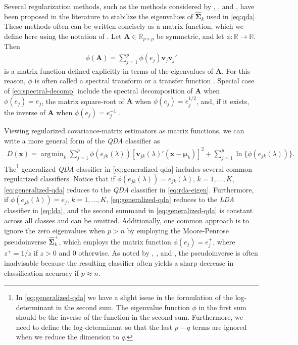 \documentclass[11pt]{article}
\DeclareMathOperator*{\argmin}{arg\,min}
\begin{document}
Several regularization methods, such as the methods considered by \citet*{Guo:2007te}, \cite{Mkhadri:1995jp}, and \citet*{Xu:2009fl}, have been proposed in the literature to stabilize the eigenvalues of $\widehat{\bm \Sigma}_k$ used in \eqref{eq:qda}. These methods often can be written concisely as a matrix function, which we define here using the notation of \cite{Izenman:2008gm}. Let $\bm A \in \mathbb{R}_{p \times p}$ be symmetric, and let $\phi:\mathbb{R} \rightarrow \mathbb{R}$. Then
\begin{align}
	\phi(\bm A) = \sum_{j = 1}^p \phi(e_j) \bm v_j \bm v_j'\label{eq:spectral-decomp}
\end{align}
is a matrix function defined explicitly in terms of the eigenvalues of $\bm A$. For this reason, $\phi$ is often called a spectral transform \citep{Ch15SSLBook} or a transfer function \citep{Ye:2009gd, Chapelle2002SSLChapter15Reference} . Special case of \eqref{eq:spectral-decomp} include the spectral decomposition of $\bm A$ when $\phi(e_j) = e_j$, the matrix square-root of $\bm A$ when $\phi(e_j) = e_j^{1/2}$, and, if it exists, the inverse of $\bm A$ when $\phi(e_j) = e_j^{-1}$ \citep{Harville:2008wja}.

Viewing regularized covariance-matrix estimators as matrix functions, we can write a more general form of the \emph{QDA} classifier as
\begin{align}
  D(\bm x) = \argmin_{k} \sum_{j = 1}^p \phi(e_{jk}(\lambda))[\bm v_{jk}(\lambda)' (\bm x - \bm \mu_k)]^2 + \sum_{j=1}^p \ln \{ \phi(e_{jk}(\lambda)) \}. \label{eq:generalized-qda}
\end{align}
The\footnote{In \eqref{eq:generalized-qda} we have a slight issue in the formulation of the log-determinant in the second sum. The eigenvalue function $\phi$ in the first sum should be the inverse of the function in the second sum. Furthermore, we need to define the log-determinant so that the last $p - q$ terms are ignored when we reduce the dimension to $q$.} generalized \emph{QDA} classifier in \eqref{eq:generalized-qda} includes several common regularized classifiers. Notice that if  $\phi(e_{jk}(\lambda)) = e_{jk}(\lambda)$, $k = 1, \ldots, K$, \eqref{eq:generalized-qda} reduces to the \emph{QDA} classifier in \eqref{eq:rda-eigen}. Furthermore, if $\phi(e_{jk}(\lambda)) = e_{j}$, $k = 1, \ldots, K$, \eqref{eq:generalized-qda} reduces to the \emph{LDA} classifier in \eqref{eq:lda}, and the second summand in \eqref{eq:generalized-qda} is constant across all classes and can be omitted. Additionally, one common approach is to ignore the zero eigenvalues when $p > n$ by employing the Moore-Penrose pseudoinverse $\widehat{\bm \Sigma}_k^{+}$, which employs the matrix function $\phi(e_j) = e_j^{+}$, where $z^{+} = 1/z$ if $z > 0$ and $0$ otherwise. As noted by \cite{Hoyle:2011vt}, \cite{Raudys:1998dd}, and \cite{Ramey:2011ji}, the pseudoinverse is often inadvisable because the resulting classifier often yields a sharp decrease in classification accuracy if $p \approx n$.
\end{document}
